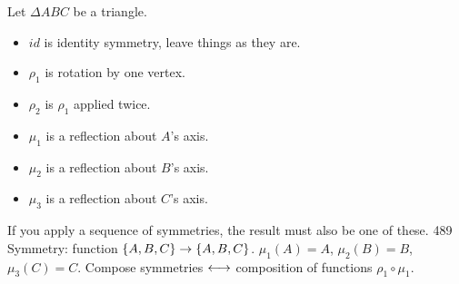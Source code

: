\documentclass[]{article}
\begin{document}
\begin{example}
		[Triangle] Let $\Delta ABC$ be a triangle.
		\begin{itemize}
				\item $id$ is identity symmetry, leave things as they are.
				\item $\rho_1$ is rotation by one vertex.
				\item $\rho_2$ is $\rho_1$ applied twice.
				\item $\mu_1$ is a reflection about $A$'s axis.
				\item $\mu_2$ is a reflection about $B$'s axis.
				\item $\mu_3$ is a reflection about $C$'s axis.
		\end{itemize}
		If you apply a sequence of symmetries, the result must also be one of these.
		489 Symmetry: function $\{A,B,C\}\rightarrow\{A,B,C\}$.
		$\mu_1(A) = A$, $\mu_2(B) = B$, $\mu_3(C) = C$.
		Compose symmetries $\longleftrightarrow$ composition of functions $\rho_1\circ \mu _1$.


\end{example}
\end{document}
